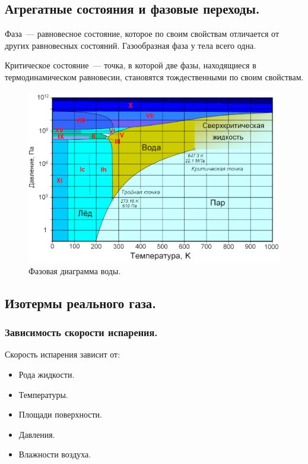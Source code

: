 \documentclass[12pt]{article}
\begin{document}
	\subsection{Агрегатные состояния и фазовые переходы.}
	\begin{definition}
		Фаза~--- равновесное состояние, которое по своим свойствам отличается от других равновесных состояний. Газообразная фаза у тела всего одна.
	\end{definition}
	\begin{definition}
		Критическое состояние~--- точка, в которой две фазы, находящиеся в термодинамическом равновесии, становятся тождественными по своим свойствам.
	\end{definition}
	\begin{figure}[H]
		\includegraphics[height=0.65\textwidth]{extra-materials/Фазовая-диаграмма-воды}
		\caption{Фазовая диаграмма воды.}
	\end{figure}
	\subsection{Изотермы реального газа.}
	\subsubsection{Зависимость скорости испарения.}
	Скорость испарения зависит от:
	\begin{itemize}
		\item Рода жидкости.
		\item Температуры.
		\item Площади поверхности.
		\item Давления.
		\item Влажности воздуха.
	\end{itemize}
\end{document}
